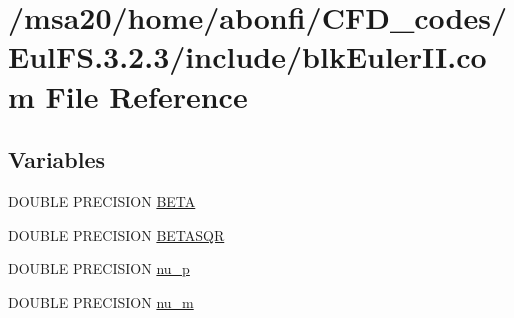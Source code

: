 \hypertarget{msa20_2home_2abonfi_2_c_f_d__codes_2_eul_f_s_83_82_83_2include_2blk_euler_i_i_8com}{\section{/msa20/home/abonfi/\-C\-F\-D\-\_\-codes/\-Eul\-F\-S.3.2.3/include/blk\-Euler\-I\-I.com File Reference}
\label{msa20_2home_2abonfi_2_c_f_d__codes_2_eul_f_s_83_82_83_2include_2blk_euler_i_i_8com}
}
\subsection*{Variables}
\begin{DoxyCompactItemize}
\item 
D\-O\-U\-B\-L\-E P\-R\-E\-C\-I\-S\-I\-O\-N \hyperlink{msa20_2home_2abonfi_2_c_f_d__codes_2_eul_f_s_83_82_83_2include_2blk_euler_i_i_8com_a41ef0ad0ee32dac89987c7180349fc65}{B\-E\-T\-A}
\item 
D\-O\-U\-B\-L\-E P\-R\-E\-C\-I\-S\-I\-O\-N \hyperlink{msa20_2home_2abonfi_2_c_f_d__codes_2_eul_f_s_83_82_83_2include_2blk_euler_i_i_8com_ac0146ab866702996a794cadecf77eb99}{B\-E\-T\-A\-S\-Q\-R}
\item 
D\-O\-U\-B\-L\-E P\-R\-E\-C\-I\-S\-I\-O\-N \hyperlink{msa20_2home_2abonfi_2_c_f_d__codes_2_eul_f_s_83_82_83_2include_2blk_euler_i_i_8com_ab283911b22384fef633cd41d154f3f2f}{nu\-\_\-p}
\item 
D\-O\-U\-B\-L\-E P\-R\-E\-C\-I\-S\-I\-O\-N \hyperlink{msa20_2home_2abonfi_2_c_f_d__codes_2_eul_f_s_83_82_83_2include_2blk_euler_i_i_8com_a98e43f19d876d2049e78b89adbf5a71d}{nu\-\_\-m}
\end{DoxyCompactItemize}


